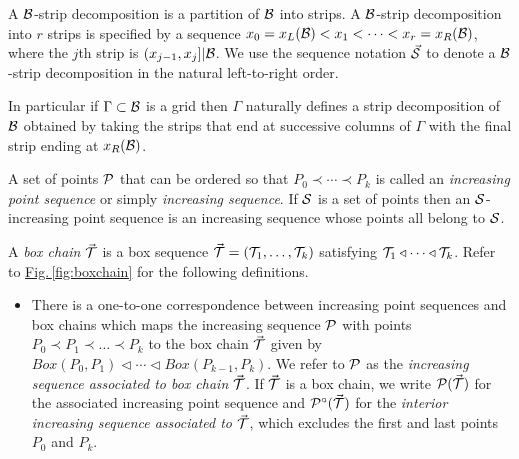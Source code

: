 \documentclass{acmsmall}
\newcommand{\cB}{{\cal B}}
\newcommand{\cP}{{\cal P}}
\newcommand{\cS}{{\cal S}}
\newcommand{\cT}{{\cal T}}
\newcommand{\Fig}[1]{\hyperref[fig:#1]{Fig.\,\ref*{fig:#1}}} %
\newcommand{\bx}{Box}
\newcommand{\strip}[2]{#1|#2}
\begin{document}
\begin{description}
A $\cB$-strip decomposition is a partition of $\cB$ into strips.
A $\cB$-strip decomposition into $r$ strips is specified by a sequence $x_0=x_L(\cB) < x_1 < \cdots < x_r = x_R(\cB)$,
where the $j$th strip is $\strip{(x_{j-1},x_j]}{\cB}$.   We use the sequence notation $\vec{\cS}$ to denote a $\cB$-strip decomposition
in the  natural left-to-right order.

In particular if $\Gamma \subset \cB$ is a grid then $\Gamma$ naturally defines
a strip decomposition of $\cB$ obtained by taking the strips that end at successive columns
of $\Gamma$ with the final strip ending at $x_R(\cB)$.

\item [{\bf Increasing point sequences} and {\bf Box Chains}]

A set of points $\cP$ that can be ordered so that
$P_0 \prec \cdots \prec P_k$ is called an {\em increasing point sequence} or simply {\em increasing sequence}.
If $\cS$ is a set of points then an $\cS$-increasing point sequence is an increasing sequence
whose points all belong to $\cS$.  

A {\em box chain} $\vec{\cT}$ is a box sequence $\vec{\cT}=(\cT_1,\ldots,\cT_k)$
satisfying $\cT_1 \triangleleft \cdots \triangleleft \cT_k$. Refer to \Fig{boxchain} for
the following definitions.
\begin{itemize}
\item
There is a one-to-one correspondence between increasing point sequences 
and box chains which maps the increasing sequence $\cP$ with points 
$P_0 \prec P_1 \prec \ldots \prec P_k$  to the box chain
$\vec{\cT}$ given by $\bx(P_0,P_1) \triangleleft \cdots \triangleleft \bx(P_{k-1},P_k)$.
We refer to  $\cP$ as the {\em increasing sequence associated to box chain $\vec{\cT}$}.
If $\vec{\cT}$ is a box chain, we write $\cP(\vec{\cT})$ for the associated  increasing point sequence
and $\cP^{\circ}(\vec{\cT})$ for the {\em interior increasing sequence associated to $\vec{\cT}$},
which excludes the first and last points $P_0$ and $P_k$.


\end{itemize}
\end{description}
\end{document}

